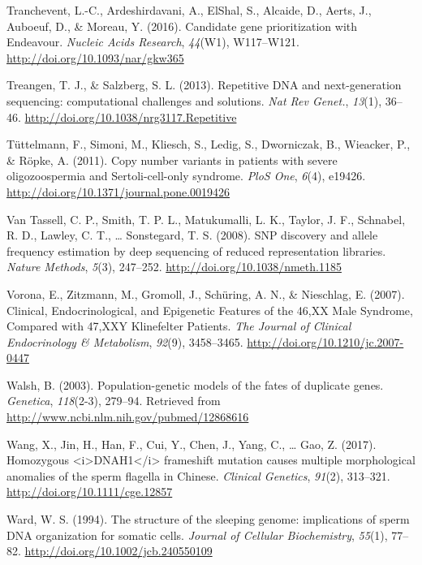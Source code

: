 \documentclass[12pt,twoside]{reedthesis}
\theoremstyle{definition}
\theoremstyle{definition}
\theoremstyle{remark}
\begin{document}
  \hypertarget{ref-Tranchevent2016}{}
  Tranchevent, L.-C., Ardeshirdavani, A., ElShal, S., Alcaide, D., Aerts,
  J., Auboeuf, D., \& Moreau, Y. (2016). Candidate gene prioritization
  with Endeavour. \emph{Nucleic Acids Research}, \emph{44}(W1),
  W117--W121. \url{http://doi.org/10.1093/nar/gkw365}
  
  \hypertarget{ref-Treangen2013}{}
  Treangen, T. J., \& Salzberg, S. L. (2013). Repetitive DNA and
  next-generation sequencing: computational challenges and solutions.
  \emph{Nat Rev Genet.}, \emph{13}(1), 36--46.
  \url{http://doi.org/10.1038/nrg3117.Repetitive}
  
  \hypertarget{ref-Tuttelmann2011}{}
  Tüttelmann, F., Simoni, M., Kliesch, S., Ledig, S., Dworniczak, B.,
  Wieacker, P., \& Röpke, A. (2011). Copy number variants in patients with
  severe oligozoospermia and Sertoli-cell-only syndrome. \emph{PloS One},
  \emph{6}(4), e19426. \url{http://doi.org/10.1371/journal.pone.0019426}
  
  \hypertarget{ref-VanTassell2008}{}
  Van Tassell, C. P., Smith, T. P. L., Matukumalli, L. K., Taylor, J. F.,
  Schnabel, R. D., Lawley, C. T., \ldots{} Sonstegard, T. S. (2008). SNP
  discovery and allele frequency estimation by deep sequencing of reduced
  representation libraries. \emph{Nature Methods}, \emph{5}(3), 247--252.
  \url{http://doi.org/10.1038/nmeth.1185}
  
  \hypertarget{ref-Vorona2007}{}
  Vorona, E., Zitzmann, M., Gromoll, J., Schüring, A. N., \& Nieschlag, E.
  (2007). Clinical, Endocrinological, and Epigenetic Features of the 46,XX
  Male Syndrome, Compared with 47,XXY Klinefelter Patients. \emph{The
  Journal of Clinical Endocrinology \& Metabolism}, \emph{92}(9),
  3458--3465. \url{http://doi.org/10.1210/jc.2007-0447}
  
  \hypertarget{ref-Walsh2003}{}
  Walsh, B. (2003). Population-genetic models of the fates of duplicate
  genes. \emph{Genetica}, \emph{118}(2-3), 279--94. Retrieved from
  \url{http://www.ncbi.nlm.nih.gov/pubmed/12868616}
  
  \hypertarget{ref-Wang2017}{}
  Wang, X., Jin, H., Han, F., Cui, Y., Chen, J., Yang, C., \ldots{} Gao,
  Z. (2017). Homozygous
  \textless{}i\textgreater{}DNAH1\textless{}/i\textgreater{} frameshift
  mutation causes multiple morphological anomalies of the sperm flagella
  in Chinese. \emph{Clinical Genetics}, \emph{91}(2), 313--321.
  \url{http://doi.org/10.1111/cge.12857}
  
  \hypertarget{ref-Ward1994}{}
  Ward, W. S. (1994). The structure of the sleeping genome: implications
  of sperm DNA organization for somatic cells. \emph{Journal of Cellular
  Biochemistry}, \emph{55}(1), 77--82.
  \url{http://doi.org/10.1002/jcb.240550109}
  
\end{document}
